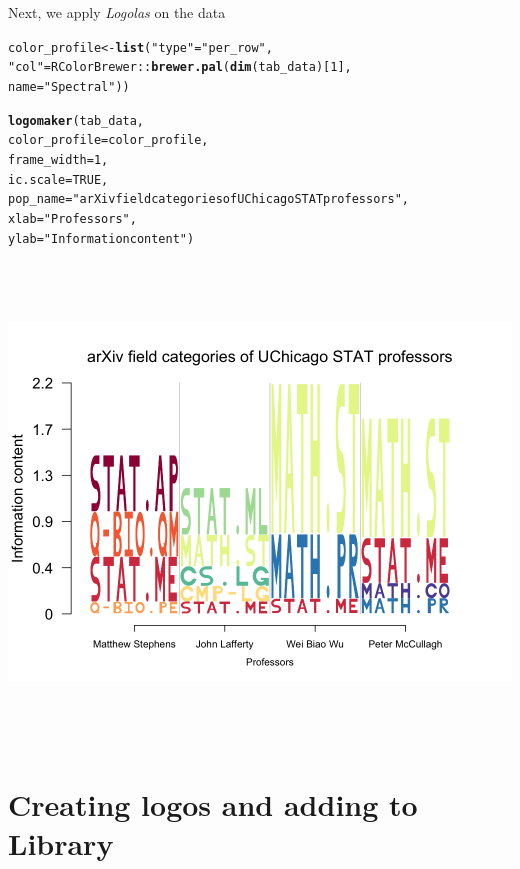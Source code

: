 \documentclass[12pt]{article}\usepackage[]{graphicx}\usepackage[usenames,dvipsnames]{color}
\makeatletter
\newcommand{\hlnum}[1]{\textcolor[rgb]{0.686,0.059,0.569}{#1}}%
\newcommand{\hlstr}[1]{\textcolor[rgb]{0.192,0.494,0.8}{#1}}%
\newcommand{\hlopt}[1]{\textcolor[rgb]{0,0,0}{#1}}%
\newcommand{\hlstd}[1]{\textcolor[rgb]{0.345,0.345,0.345}{#1}}%
\newcommand{\hlkwb}[1]{\textcolor[rgb]{0.69,0.353,0.396}{#1}}%
\newcommand{\hlkwc}[1]{\textcolor[rgb]{0.333,0.667,0.333}{#1}}%
\newcommand{\hlkwd}[1]{\textcolor[rgb]{0.737,0.353,0.396}{\textbf{#1}}}%
\newenvironment{kframe}{%
 \def\at@end@of@kframe{}%
 \ifinner\ifhmode%
  \def\at@end@of@kframe{\end{minipage}}%
  \begin{minipage}{\columnwidth}%
 \fi\fi%
 \def\FrameCommand##1{\hskip\@totalleftmargin \hskip-\fboxsep
 \colorbox{shadecolor}{##1}\hskip-\fboxsep
     \hskip-\linewidth \hskip-\@totalleftmargin \hskip\columnwidth}%
 \MakeFramed {\advance\hsize-\width
   \@totalleftmargin\z@ \linewidth\hsize
   \@setminipage}}%
 {\par\unskip\endMakeFramed%
 \at@end@of@kframe}
\newenvironment{knitrout}{}{} %
\newcommand{\Logolas}{\textit{Logolas}}
\makeatother
\begin{document}
Next, we apply \Logolas{} on the data

\begin{knitrout}
\color{fgcolor}\begin{kframe}
\begin{alltt}
\hlstd{color_profile} \hlkwb{<-} \hlkwd{list}\hlstd{(}\hlstr{"type"} \hlstd{=} \hlstr{"per_row"}\hlstd{,}
                      \hlstr{"col"} \hlstd{= RColorBrewer}\hlopt{::}\hlkwd{brewer.pal}\hlstd{(}\hlkwd{dim}\hlstd{(tab_data)[}\hlnum{1}\hlstd{],}
          \hlkwc{name} \hlstd{=} \hlstr{"Spectral"}\hlstd{))}

\hlkwd{logomaker}\hlstd{(tab_data,}
          \hlkwc{color_profile} \hlstd{= color_profile,}
          \hlkwc{frame_width} \hlstd{=} \hlnum{1}\hlstd{,}
          \hlkwc{ic.scale} \hlstd{=} \hlnum{TRUE}\hlstd{,}
          \hlkwc{pop_name} \hlstd{=} \hlstr{"arXiv field categories of UChicago STAT professors"}\hlstd{,}
          \hlkwc{xlab} \hlstd{=} \hlstr{"Professors"}\hlstd{,}
          \hlkwc{ylab} \hlstd{=} \hlstr{"Information content"}\hlstd{)}
\end{alltt}
\end{kframe}
\includegraphics[width=7in,height=5in]{figure/logolas_use_12-1} 

\end{knitrout}


\section{Creating logos and adding to Library}
\end{document}

